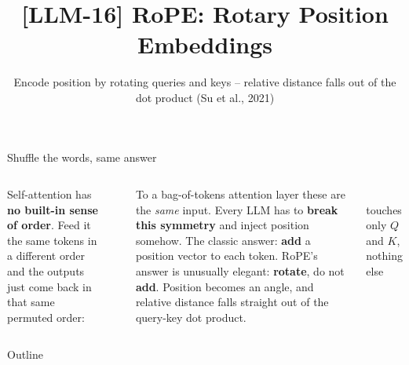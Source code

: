 \documentclass[aspectratio=169]{beamer}
\title{[LLM-16] RoPE: Rotary Position Embeddings}
\subtitle{Encode position by rotating queries and keys -- relative distance falls out of the dot product \quad(Su et al., 2021)}
\date{}
\begin{document}
\begin{frame}{Shuffle the words, same answer}
  \begin{columns}[T]
    Self-attention has \textbf{no built-in sense of order}. Feed it the same tokens in a
    different order and the outputs just come back in that same permuted order:
    \vskip 4pt
    \begin{center}
    \end{center}
    \vskip 4pt
    To a bag-of-tokens attention layer these are the \emph{same} input. Every LLM has to
    \textbf{break this symmetry} and inject position somehow.
    \vskip 8pt
    The classic answer: \textbf{add} a position vector to each token. RoPE's answer is
    unusually elegant: \textbf{rotate}, do not \textbf{add}. Position becomes an angle, and
    relative distance falls straight out of the query-key dot product.
    \begin{center}
      \\[6pt]
      {\scriptsize touches only $Q$ and $K$, nothing else}
    \end{center}
  \end{columns}
\end{frame}

\begin{frame}{Outline}
  \tableofcontents
\end{frame}
\end{document}
